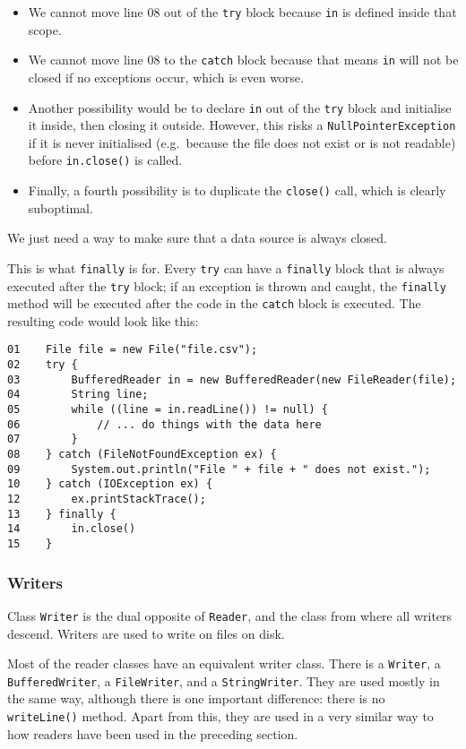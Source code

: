 \begin{itemize}
\item We cannot move 
  line 08 out of the \verb+try+ block because
  \verb+in+ is defined inside that scope.
\item We cannot move 
  line 08 to the \verb+catch+ block because that means
  \verb+in+ will not be closed if no exceptions occur, which is even
  worse. 
\item Another possibility would be to declare \verb+in+ out of the
  \verb+try+ block and initialise it inside, then closing it
  outside. However, this risks a \verb+NullPointerException+ if it is
  never initialised (e.g.~because the file does not exist or is not
  readable) before \verb+in.close()+ is called. 
\item Finally, a fourth possibility is to duplicate the \verb+close()+
  call, which is clearly suboptimal.
\end{itemize}

We just need a way to make sure that a data source is always closed. 

This is what \verb+finally+ is for. Every \verb+try+ can have a
\verb+finally+ block that is always executed after the \verb+try+
block; if an exception is thrown and caught, the \verb+finally+
method will be executed after the code in the \verb+catch+ block is
executed. The resulting code would look like this: 

\begin{verbatim}
01    File file = new File("file.csv");
02    try {
03        BufferedReader in = new BufferedReader(new FileReader(file); 
04        String line;
05        while ((line = in.readLine()) != null) {
06            // ... do things with the data here
07        }
08    } catch (FileNotFoundException ex) {
09        System.out.println("File " + file + " does not exist.");
10    } catch (IOException ex) {
12        ex.printStackTrace();
13    } finally { 
14        in.close()
15    }
\end{verbatim}


\subsubsection{Writers}
\label{sec:writers}

Class \verb+Writer+ is the dual opposite of \verb+Reader+, and the
class from where all writers descend. Writers are used to write on
files on disk. 

Most of the reader classes have an equivalent writer class. There is a
\verb+Writer+, a \verb+BufferedWriter+, a \verb+FileWriter+, and a
\verb+StringWriter+. They are used mostly in the same way, although
there is one important difference: there is no \verb+writeLine()+
method. Apart from this, they are used in a very similar way to how
readers have been used in the preceding section. 

